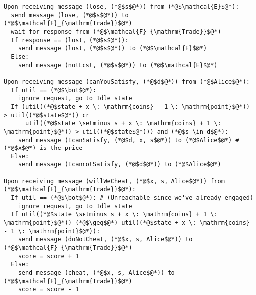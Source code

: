 \begin{lstlisting}[label=satprot, style=numbers]
Upon receiving message (lose, (*@$s$@*)) from (*@$\mathcal{E}$@*):
  send message (lose, (*@$s$@*)) to (*@$\mathcal{F}_{\mathrm{Trade}}$@*)
  wait for response from (*@$\mathcal{F}_{\mathrm{Trade}}$@*)
  If response == (lost, (*@$s$@*)):
    send message (lost, (*@$s$@*)) to (*@$\mathcal{E}$@*)
  Else:
    send message (notLost, (*@$s$@*)) to (*@$\mathcal{E}$@*)

Upon receiving message (canYouSatisfy, (*@$d$@*)) from (*@$Alice$@*):
  If util == (*@$\bot$@*):
    ignore request, go to Idle state
  If (util((*@$state + x \: \mathrm{coins} - 1 \: \mathrm{point}$@*)) > util((*@$state$@*)) or
      util((*@$state \setminus s + x \: \mathrm{coins} + 1 \: \mathrm{point}$@*)) > util((*@$state$@*))) and (*@$s \in d$@*):
    send message (IcanSatisfy, (*@$d, x, s$@*)) to (*@$Alice$@*) # (*@$x$@*) is the price
  Else:
    send message (IcannotSatisfy, (*@$d$@*)) to (*@$Alice$@*)

Upon receiving message (willWeCheat, (*@$x, s, Alice$@*)) from (*@$\mathcal{F}_{\mathrm{Trade}}$@*):
  If util == (*@$\bot$@*): # (Unreachable since we've already engaged)
    ignore request, go to Idle state
  If util((*@$state \setminus s + x \: \mathrm{coins} + 1 \: \mathrm{point}$@*)) (*@$\geq$@*) util((*@$state + x \: \mathrm{coins} - 1 \: \mathrm{point}$@*)):
    send message (doNotCheat, (*@$x, s, Alice$@*)) to (*@$\mathcal{F}_{\mathrm{Trade}}$@*)
    score = score + 1
  Else:
    send message (cheat, (*@$x, s, Alice$@*)) to (*@$\mathcal{F}_{\mathrm{Trade}}$@*)
    score = score - 1
\end{lstlisting}
